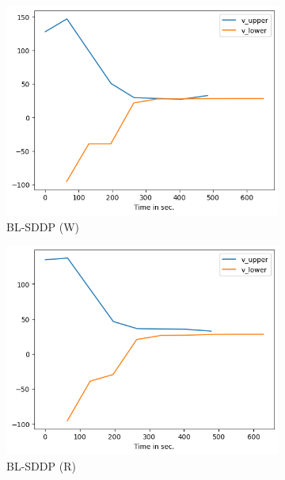 \documentclass[a4paper,12pt]{article}
\begin{document}
\begin{figure}[h]
\medskip
\begin{subfigure}{0.32\textwidth}
  \includegraphics[width=\linewidth]{blsddp_6_worst.png}
  \caption{BL-SDDP (W)}
  \label{fig:4}
\end{subfigure}\hfil %
\begin{subfigure}{0.32\textwidth}
  \includegraphics[width=\linewidth]{blsddp_6_random.png}
  \caption{BL-SDDP (R)}
  \label{fig:5}
\end{subfigure}\hfil %
\begin{subfigure}{0.32\textwidth}

\end{subfigure}
\end{figure}
\end{document}
